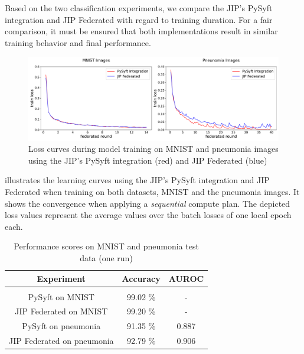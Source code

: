 Based on the two classification experiments, we compare the JIP's PySyft integration and JIP Federated with regard to training duration. For a fair comparison, it must be ensured that both implementations result in similar training behavior and final performance.

\begin{figure}[htbp]
    \centerline{\includegraphics[width=1.0\textwidth]{1_Figures/RuntimeExperiments_horizontal.pdf}}
    \caption[Loss curves during model training on MNIST and pneunomia images]{Loss curves during model training on MNIST and pneumonia images using the JIP's PySyft integration (red) and JIP Federated (blue)}
\label{fig:RuntimeExp}
\end{figure}

 illustrates the learning curves using the JIP's PySyft integration and JIP Federated when training on both datasets, MNIST and the pneumonia images. It shows the convergence when applying a \textit{sequential} compute plan. The depicted loss values represent the average values over the batch losses of one local epoch each.

\begin{table}[htbp]
  \centering
  \begin{tabular}{ccc}
  Experiment & Accuracy & AUROC \\
  \hline \\[-2.5ex] %
  PySyft on MNIST               & 99.02 \% & - \\
  JIP Federated on MNIST        & 99.20 \% & - \\
  PySyft on pneumonia           & 91.35 \% & 0.887 \\
  JIP Federated on pneumonia    & 92.79 \% & 0.906 \\
 \end{tabular}
 \caption[Performance scores on MNIST and pneunomia test data]{Performance scores on MNIST and pneumonia test data (one run)}
 \label{tab:Performance}
\end{table}

